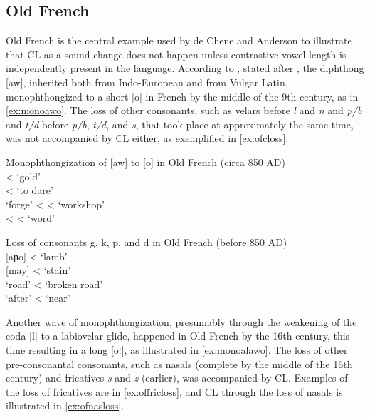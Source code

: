 \documentclass[output=paper,
modfonts
]{LSP/langsci}
\begin{document}
\subsection{Old French}

Old French is the central example used by de Chene and Anderson to
illustrate that CL as a sound change does not happen unless contrastive
vowel length is independently present in the language. According to \citet[527--528]{deChene1979}, stated after \citet[79,191]{pope1934}, the
diphthong {[}aw{]}, inherited both from Indo-European and from Vulgar
Latin, monophthongized to a short {[}o{]} in French by the middle of the
9th century, as in \cref{ex:monoawo}. The loss of other consonants,
such as velars before \emph{l} and \emph{n} and \emph{p/b} and
\emph{t/d} before \emph{p/b}, \emph{t/d}, and \emph{s}, that took place
at approximately the same time, was not accompanied by CL either, as
exemplified in \cref{ex:ofcloss}:

\ea\label{ex:oldfrench1}
	\ea\label{ex:monoawo}Monophthongization of {[}aw{]} to {[}o{]} in Old French (circa 850 AD)\\
	 \textless{}  `gold'\\
	 \textless{}  `to dare'\\
	 `forge' \textless{}  \textless{}  `workshop'\\
	 \textless{}  \textless{}  `word'
	
	\ex\label{ex:ofcloss}Loss of consonants g, k, p, and d in Old French (before 850 AD)\\
	 {[}aɲo{]} \textless{}  `lamb'\\
	 {[}may{]} \textless{}  `stain'\\
	 `road' \textless{}   `broken road'\\
	 `after' \textless{}  `near'
	\z
\z

Another wave of  monophthongization, presumably through the weakening
of the coda {[}l{]} to a labiovelar glide, happened in Old French by the
16th century, this time resulting in a long {[}oː{]},
as illustrated in \cref{ex:monoalawo}. The loss of other pre-consonantal consonants,
such as nasals (complete by the middle of the 16th
century) and fricatives \emph{s} and \emph{z} (earlier), was accompanied
by CL. Examples of the loss of fricatives are in \cref{ex:offricloss}, and CL through
the loss of nasals is illustrated in \cref{ex:ofnasloss}.
\end{document}
